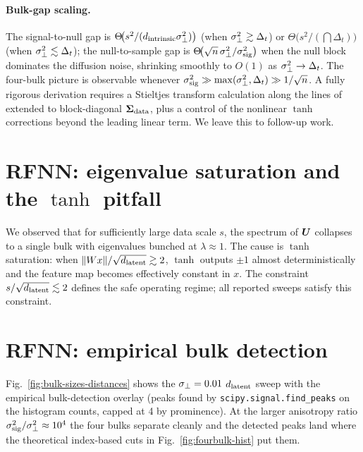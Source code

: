 \paragraph{Bulk-gap scaling.}
The signal-to-null gap is
$\Theta\!\bigl(s^2/(d_{\mathrm{intrinsic}}\sigma_{\perp}^2)\bigr)$ (when
$\sigma_{\perp}^2 \gtrsim \Delta_t$) or $\Theta\!\bigl(s^2/(\dint\Delta_t)\bigr)$
(when $\sigma_{\perp}^2 \lesssim \Delta_t$); the null-to-sample gap is
$\Theta\!\bigl(\sqrt{n}\,\sigma_{\perp}^2/\sigma_{\mathrm{sig}}^2\bigr)$ when the
null block dominates the diffusion noise, shrinking smoothly to
$O(1)$ as $\sigma_{\perp}^2 \to \Delta_t$. The four-bulk picture is
observable whenever $\sigma_{\mathrm{sig}}^2 \gg \max(\sigma_{\perp}^2, \Delta_t) \gg
1/\sqrt{n}$. A fully rigorous derivation requires a Stieltjes
transform calculation along the lines of
\citet{bonnaire2025, ELKaroui2010spectrum, benigni2021eigenvalue}
extended to block-diagonal $\bm{\Sigma}_{\mathrm{data}}$, plus a control of the
nonlinear $\tanh$ corrections beyond the leading linear term. We
leave this to follow-up work.

\section{RFNN: eigenvalue saturation and the $\tanh$ pitfall}
\label{app:saturation}

We observed that for sufficiently large data scale $s$, the spectrum of
$\bm{U}$ collapses to a single bulk with eigenvalues bunched at
$\lambda \approx 1$. The cause is $\tanh$ saturation: when
$\|Wx\|/\sqrt{d_{\mathrm{latent}}} \gtrsim 2$, $\tanh$ outputs $\pm 1$ almost
deterministically and the feature map becomes effectively constant in
$x$. The constraint $s/\sqrt{d_{\mathrm{latent}}} \lesssim 2$ defines the safe
operating regime; all reported sweeps satisfy this constraint.

\section{RFNN: empirical bulk detection}
\label{app:bulk-detection}

Fig.~\ref{fig:bulk-sizes-distances} shows the $\sigma_{\perp} = 0.01$
$d_{\mathrm{latent}}$ sweep with the empirical bulk-detection overlay (peaks
found by \texttt{scipy.signal.find\_peaks} on the histogram counts,
capped at 4 by prominence). At the larger anisotropy ratio
$\sigma_{\mathrm{sig}}^2/\sigma_{\perp}^2 \approx 10^4$ the four bulks separate
cleanly and the detected peaks land where the theoretical
index-based cuts in Fig.~\ref{fig:fourbulk-hist} put them.

